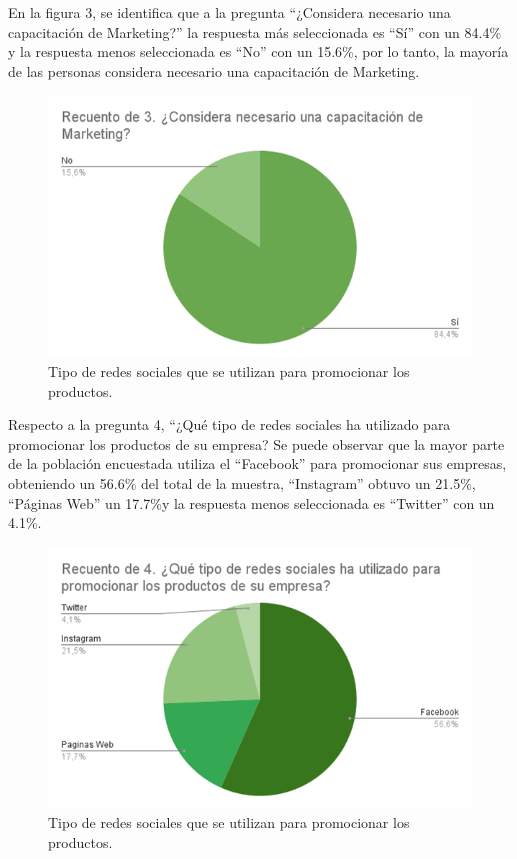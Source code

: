 \documentclass[12pt]{difu100cia} %
\begin{document}
	
En la figura 3, se identifica que a la pregunta “¿Considera necesario una capacitación de Marketing?” la respuesta más seleccionada es “Sí” con un 84.4\% y la respuesta menos seleccionada es “No” con un 15.6\%, por lo tanto, la mayoría de las personas considera necesario una capacitación de Marketing.

\begin{figure}[!htb]
	\centering
	\includegraphics[width=\linewidth]{Figura 4.png}
	\caption{Tipo de redes sociales que se utilizan para promocionar los productos.}
	\label{Figur 4}
\end{figure}
	
Respecto a la pregunta 4, “¿Qué tipo de redes sociales ha utilizado para promocionar los productos de su empresa?  Se puede observar que la mayor parte de la población encuestada utiliza el “Facebook” para promocionar sus empresas, obteniendo un 56.6\% del total de la muestra, “Instagram” obtuvo un 21.5\%, “Páginas Web” un 17.7\%y la respuesta menos seleccionada es “Twitter” con un 4.1\%. 

\begin{figure}[!htb]
	\centering
	\includegraphics[width=\linewidth]{Figura 5.png}
	\caption{Tipo de redes sociales que se utilizan para promocionar los productos.}
	\label{Figur 5}
\end{figure}
	
\end{document}
